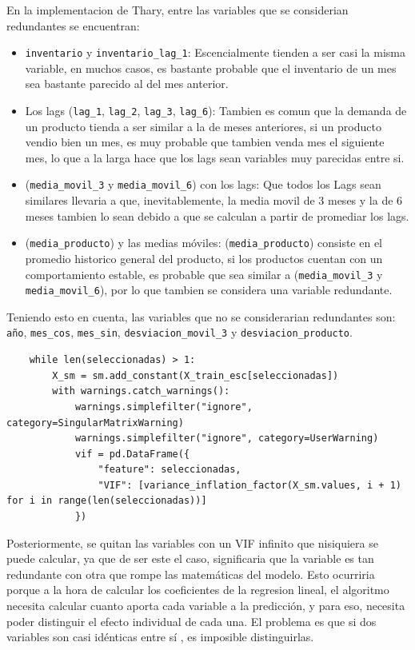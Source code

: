 En la implementacion de Thary, entre las variables que se considerian redundantes se encuentran:

\begin{itemize}
    \item \texttt{inventario} y \texttt{inventario\_lag\_1}: Escencialmente tienden a ser casi la misma variable, en muchos casos, es bastante probable que el inventario de un mes sea bastante parecido al del mes anterior.
    \item Los lags (\texttt{lag\_1}, \texttt{lag\_2}, \texttt{lag\_3}, \texttt{lag\_6}): Tambien es comun que la demanda de un producto tienda a ser similar a la de meses anteriores, si un producto vendio bien un mes, es muy probable que tambien venda mes el siguiente mes, lo que a la larga hace que los lags sean variables muy parecidas entre si.
    \item (\texttt{media\_movil\_3} y \texttt{media\_movil\_6}) con los lags: Que todos los Lags sean similares llevaria a que, inevitablemente, la media movil de 3 meses y la de 6 meses tambien lo sean debido a que se calculan a partir de promediar los lags.
    \item (\texttt{media\_producto}) y las medias móviles: (\texttt{media\_producto}) consiste en el promedio historico general del producto, si los productos cuentan con un comportamiento estable, es probable que sea similar a (\texttt{media\_movil\_3} y \texttt{media\_movil\_6}), por lo que tambien se considera una variable redundante.
\end{itemize}

Teniendo esto en cuenta, las variables que no se considerarian redundantes son: \texttt{año}, \texttt{mes\_cos}, \texttt{mes\_sin}, \texttt{desviacion\_movil\_3} y \texttt{desviacion\_producto}.

\begin{verbatim}
    while len(seleccionadas) > 1:
        X_sm = sm.add_constant(X_train_esc[seleccionadas])
        with warnings.catch_warnings():
            warnings.simplefilter("ignore", category=SingularMatrixWarning)
            warnings.simplefilter("ignore", category=UserWarning)
            vif = pd.DataFrame({
                "feature": seleccionadas,
                "VIF": [variance_inflation_factor(X_sm.values, i + 1) for i in range(len(seleccionadas))]
            })
\end{verbatim}

Posteriormente, se quitan las variables con un VIF infinito que nisiquiera se puede calcular, ya que de ser este el caso, significaria que la variable es tan redundante con otra que rompe las matemáticas del modelo. Esto ocurriria porque a la hora de calcular los coeficientes de la regresion lineal, el algoritmo necesita calcular cuanto aporta cada variable a la predicción, y para eso, necesita poder distinguir el efecto individual de cada una. El problema es que si dos variables son casi idénticas entre sí , es imposible distinguirlas.

